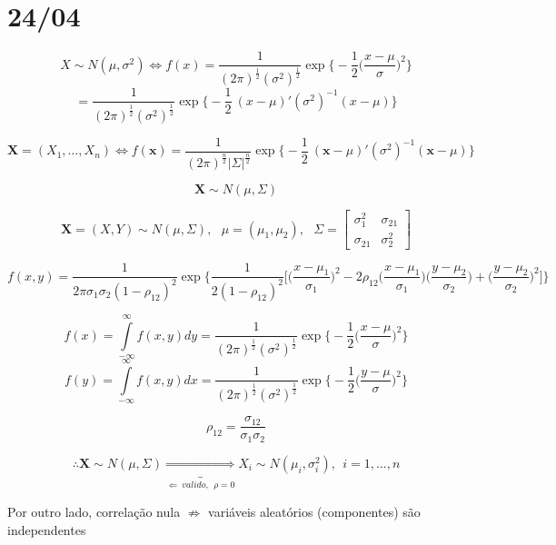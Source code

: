 \documentclass[a4paper,12pt]{article}
\begin{document}
\section{24/04}
$$ 
X\sim N(\mu,\sigma^2)\Leftrightarrow f(x) = \frac{1}{(2\pi)^{\frac{1}{2} }(\sigma^2)^\frac{1}{2}}\exp \bigg\{- \frac{1}{2}\bigg(
\frac{x-\mu}{\sigma}
\bigg)^2\bigg\}$$
$$
=
\frac{1}{(2\pi)^{\frac{1}{2} }(\sigma^2)^\frac{1}{2}}
\exp \bigg\{- \frac{1}{2}\
(x-\mu)'(\sigma^2)^{-1}(x- \mu)
\bigg\}
$$

$$
\bm X = (X_1,\ldots,X_n) \Leftrightarrow f(\bm x) = 
\frac{1}{(2\pi)^{\frac{n}{2} }|\Sigma|^\frac{n}{2}}
\exp \bigg\{- \frac{1}{2}\
(\bm x-\mu)'(\sigma^2)^{-1}(\bm x- \mu)
\bigg\}
$$

$$\bm X \sim N(\mu,\Sigma) $$

$$\bm X = (X,Y)\sim N(\mu,\Sigma), \ \ \ \mu=(\mu_1,\mu_2), \ \ \ \Sigma = \begin{bmatrix}
\sigma_1^2 & \sigma_{21}\\
\sigma_{21} & \sigma_2^2
\end{bmatrix} $$

$$f(x,y) = 
\frac{1}{2\pi \sigma_1\sigma_2(1-\rho_{12})^2}
\exp\bigg\{
\frac{1}{2(1-\rho_{12})^2}\bigg[
\bigg(
\frac{x-\mu_1}{\sigma_1}
\bigg)^2
-
2\rho_{12}
\bigg(
\frac{x-\mu_1}{\sigma_1}
\bigg)
\bigg(
\frac{y-\mu_2}{\sigma_2}
\bigg)
+
\bigg(
\frac{y-\mu_2}{\sigma_2}
\bigg)^2
\bigg]
\bigg\}
 $$
 
 
 $$
 f(x) =\int\limits_{-\infty}^{\infty}  f(x,y)dy= \frac{1}{(2\pi)^{\frac{1}{2} }(\sigma^2)^\frac{1}{2}}\exp \bigg\{- \frac{1}{2}\bigg(
 \frac{x-\mu}{\sigma}
 \bigg)^2\bigg\}$$
$$
 f(y) =\int\limits_{-\infty}^{\infty}  f(x,y)dx= \frac{1}{(2\pi)^{\frac{1}{2} }(\sigma^2)^\frac{1}{2}}\exp \bigg\{- \frac{1}{2}\bigg(
\frac{y-\mu}{\sigma}
\bigg)^2\bigg\}$$

$$\rho_{12}=\frac{\sigma_{12}}{\sigma_1\sigma_2} $$

$$\therefore \bm X\sim N(\mu,\Sigma)\underbrace{\Rightarrow}_{\Leftarrow \ valido,  \ \ \rho=0} X_i \sim N(\mu_i,\sigma^2_i),\ \ i=1,\ldots,n $$

Por outro lado, correlação nula $\not\Rightarrow$ variáveis aleatórios (componentes) são independentes  \\
\\
\end{document}
